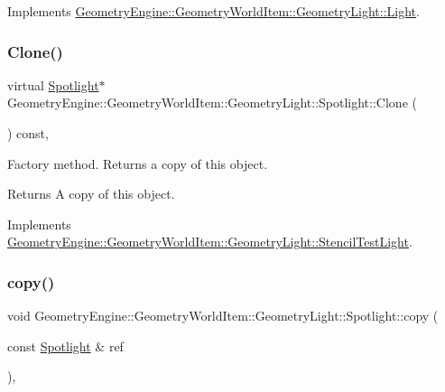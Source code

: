 Implements \mbox{\hyperlink{class_geometry_engine_1_1_geometry_world_item_1_1_geometry_light_1_1_light_a58aa2a3520f7aa2b03afcb4123e7530a}{Geometry\+Engine\+::\+Geometry\+World\+Item\+::\+Geometry\+Light\+::\+Light}}.

\mbox{\label{class_geometry_engine_1_1_geometry_world_item_1_1_geometry_light_1_1_spotlight_a7feb062f72b8110cf7d8d614d2daad92}} 
\subsubsection{\texorpdfstring{Clone()}{Clone()}}
{\footnotesize\ttfamily virtual \mbox{\hyperlink{class_geometry_engine_1_1_geometry_world_item_1_1_geometry_light_1_1_spotlight}{Spotlight}}$\ast$ Geometry\+Engine\+::\+Geometry\+World\+Item\+::\+Geometry\+Light\+::\+Spotlight\+::\+Clone (\begin{DoxyParamCaption}{ }\end{DoxyParamCaption}) const\hspace{0.3cm}{\ttfamily [inline]}, {\ttfamily [virtual]}}

Factory method. Returns a copy of this object. \begin{DoxyReturn}{Returns}
A copy of this object. 
\end{DoxyReturn}


Implements \mbox{\hyperlink{class_geometry_engine_1_1_geometry_world_item_1_1_geometry_light_1_1_stencil_test_light_a6434a228dc64537ff9984c82eaf8ab07}{Geometry\+Engine\+::\+Geometry\+World\+Item\+::\+Geometry\+Light\+::\+Stencil\+Test\+Light}}.

\mbox{\label{class_geometry_engine_1_1_geometry_world_item_1_1_geometry_light_1_1_spotlight_a72de80e80891832884e039beec532e19}} 
\subsubsection{\texorpdfstring{copy()}{copy()}}
{\footnotesize\ttfamily void Geometry\+Engine\+::\+Geometry\+World\+Item\+::\+Geometry\+Light\+::\+Spotlight\+::copy (\begin{DoxyParamCaption}\item[{const \mbox{\hyperlink{class_geometry_engine_1_1_geometry_world_item_1_1_geometry_light_1_1_spotlight}{Spotlight}} \&}]{ref }\end{DoxyParamCaption})\hspace{0.3cm}{\ttfamily [protected]}, {\ttfamily [virtual]}}

